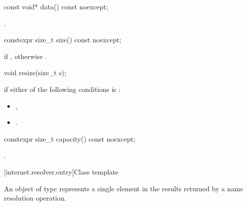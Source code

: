 \begin{itemdecl}
const void* data() const noexcept;
\end{itemdecl}

\begin{itemdescr}
\pnum
\returns {}.
\end{itemdescr}

\begin{itemdecl}
constexpr size_t size() const noexcept;
\end{itemdecl}

\begin{itemdescr}
\pnum
\returns {} if , otherwise .
\end{itemdescr}

\begin{itemdecl}
void resize(size_t s);
\end{itemdecl}

\begin{itemdescr}
\pnum
\remarks {} if either of the following conditions is :
\begin{itemize}
\item {},
\item {}.
\end{itemize}
\end{itemdescr}

\begin{itemdecl}
constexpr size_t capacity() const noexcept;
\end{itemdecl}

\begin{itemdescr}
\pnum
\returns {}.
\end{itemdescr}




%
[internet.resolver.entry]{Class template }

\pnum
An object of type  represents a single element in the results returned by a name resolution operation.

